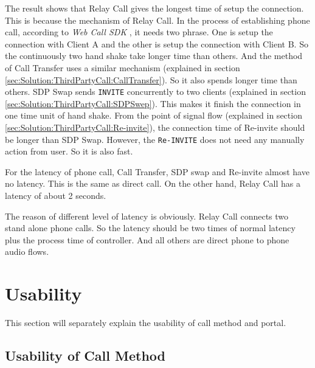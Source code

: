 The result shows that \textsf{Relay Call} gives the longest time of setup the connection. This is because the mechanism of Relay Call. In the process of establishing phone call, according to \textit{Web Call SDK} \cite{WebCallSDK}, it needs two phrase. One is setup the connection with Client A and the other is setup the connection with Client B. So the continuously two hand shake take longer time than others. And the method of \textsf{Call Transfer} uses a similar mechanism (explained in section \ref{sec:Solution:ThirdPartyCall:CallTransfer}). So it also spends longer time than others. \textsf{SDP Swap} sends \texttt{INVITE} concurrently to two clients (explained in section \ref{sec:Solution:ThirdPartyCall:SDPSwep}). This makes it finish the connection in one time unit of hand shake. From the point of signal flow (explained in section \ref{sec:Solution:ThirdPartyCall:Re-invite}), the connection time of \textsf{Re-invite} should be longer than \textsf{SDP Swap}. However, the \texttt{Re-INVITE} does not need any manually action from user. So it is also fast.

For the latency of phone call, \textsf{Call Transfer}, \textsf{SDP swap} and \textsf{Re-invite} almost have no latency. This is the same as direct call. On the other hand, \textsf{Relay Call} has a latency of about 2 seconds. 

The reason of different level of latency is obviously. Relay Call connects two stand alone phone calls. So the latency should be two times of normal latency plus the process time of controller. And all others are direct phone to phone audio flows.

\section{Usability}

This section will separately explain the usability of call method and portal.

\subsection{Usability of Call Method}
\label{sec:Analysis:Usability:UsabilityOfCallMethod}

